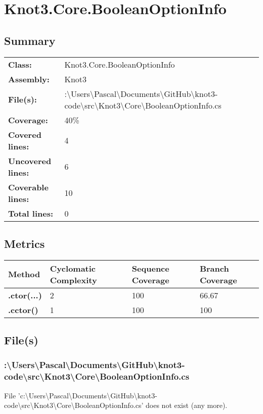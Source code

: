 \documentclass[a4paper,10pt]{article}
\begin{document}
\section{Knot3.Core.BooleanOptionInfo}
\subsection{Summary}
\begin{longtable}[l]{ll}
\textbf{Class:} & Knot3.Core.BooleanOptionInfo\\
\textbf{Assembly:} & Knot3\\
\textbf{File(s):} & \begin{minipage}[t]{12cm}{:\textbackslash Users\textbackslash Pascal\textbackslash Documents\textbackslash GitHub\textbackslash knot3-code\textbackslash src\textbackslash Knot3\textbackslash Core\textbackslash BooleanOptionInfo.cs}\end{minipage} \\
\textbf{Coverage:} & 40\%\\
\textbf{Covered lines:} & 4\\
\textbf{Uncovered lines:} & 6\\
\textbf{Coverable lines:} & 10\\
\textbf{Total lines:} & 0\\
\end{longtable}
\subsection{Metrics}
\begin{longtable}[l]{|l|l|l|l|}
\hline
\textbf{Method} & \textbf{Cyclomatic Complexity} & \textbf{Sequence Coverage} & \textbf{Branch Coverage}\\
\hline
\textbf{.ctor(...)} & 2 & 100 & 66.67\\
\hline
\textbf{.cctor()} & 1 & 100 & 100\\
\hline
\end{longtable}
\subsection{File(s)}
\subsubsection{:\textbackslash Users\textbackslash Pascal\textbackslash Documents\textbackslash GitHub\textbackslash knot3-code\textbackslash src\textbackslash Knot3\textbackslash Core\textbackslash BooleanOptionInfo.cs}
 File 'c:\textbackslash Users\textbackslash Pascal\textbackslash Documents\textbackslash GitHub\textbackslash knot3-code\textbackslash src\textbackslash Knot3\textbackslash Core\textbackslash BooleanOptionInfo.cs' does not exist (any more).
\newpage
\end{document}
